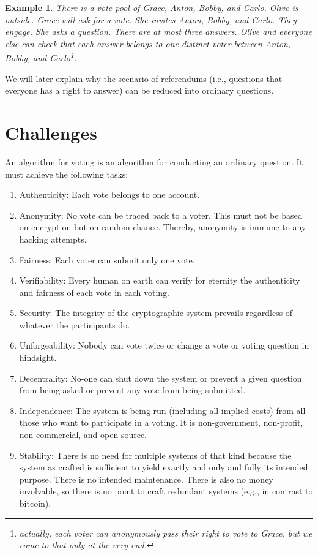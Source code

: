 \documentclass{article}
\newtheorem{xpl}[thm]{Example}
\theoremstyle{definition}
\begin{document}
	\begin{xpl}
		There is a vote pool of Grace, Anton, Bobby, and Carlo. Olive is outside. Grace will ask for a vote. She invites Anton, Bobby, and Carlo. They engage. She asks a question. There are at most three answers. Olive and everyone else can check that each answer belongs to one distinct voter between Anton, Bobby, and Carlo\footnote{actually, each voter can anonymously pass their right to vote to Grace, but we come to that only at the very end.}.
	\end{xpl}
	
	We will later explain why the scenario of referendums (i.e., questions that everyone has a right to answer) can be reduced into ordinary questions.
	
	\section{Challenges}
	An algorithm for voting is an algorithm for conducting an ordinary question. It must achieve the following tasks:
	\begin{enumerate}
		\item Authenticity: Each vote belongs to one account.
		\item Anonymity: No vote can be traced back to a voter. This must not be based on encryption but on random chance. Thereby, anonymity is immune to any hacking attempts.
		\item Fairness: Each voter can submit only one vote.
		\item Verifiability: Every human on earth can verify for eternity the authenticity and fairness of each vote in each voting.
		\item Security: The integrity of the cryptographic system prevails regardless of whatever the participants do.
		\item Unforgeability: Nobody can vote twice or change a vote or voting question in hindsight.
		\item Decentrality: No-one can shut down the system or prevent a given question from being asked or prevent any vote from being submitted.
		\item Independence: The system is being run (including all implied costs) from all those who want to participate in a voting. It is non-government, non-profit, non-commercial, and open-source.
		\item Stability: There is no need for multiple systems of that kind because the system as crafted is sufficient to yield exactly and only and fully its intended purpose. There is no intended maintenance. There is also no money involvable, so there is no point to craft redundant systems (e.g., in contrast to bitcoin).
	\end{enumerate}
	
\end{document}
